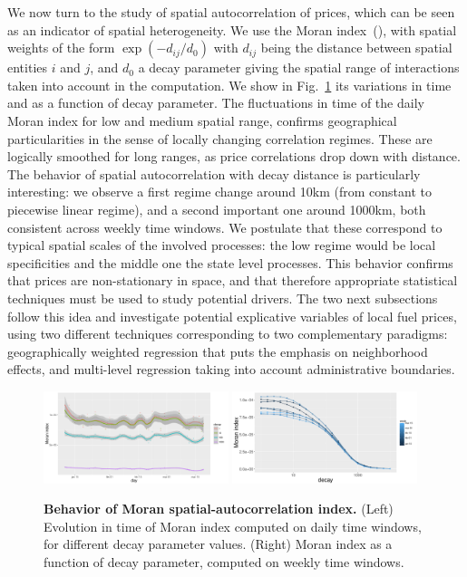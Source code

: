 \documentclass[3p,times,procedia]{elsarticle}
\begin{document}
We now turn to the study of spatial autocorrelation of prices, which can be seen as an indicator of spatial heterogeneity. We use the Moran index~(\cite{tsai2005quantifying}), with spatial weights of the form $\exp{\left(-d_{ij} / d_0 \right)}$ with $d_{ij}$ being the distance between spatial entities $i$ and $j$, and $d_0$ a decay parameter giving the spatial range of interactions taken into account in the computation. We show in Fig.~\ref{fig:moran} its variations in time and as a function of decay parameter. 
The fluctuations in time of the daily Moran index for low and medium spatial range, confirms geographical particularities in the sense of locally changing correlation regimes. These are logically smoothed for long ranges, as price correlations drop down with distance. The behavior of spatial autocorrelation with decay distance is particularly interesting: we observe a first regime change around 10km (from constant to piecewise linear regime), and a second important one around 1000km, both consistent across weekly time windows. We postulate that these correspond to typical spatial scales of the involved processes: the low regime would be local specificities and the middle one the state level processes. This behavior confirms that prices are non-stationary in space, and that therefore appropriate statistical techniques must be used to study potential drivers. The two next subsections follow this idea and investigate potential explicative variables of local fuel prices, using two different techniques corresponding to two complementary paradigms: geographically weighted regression that puts the emphasis on neighborhood effects, and multi-level regression taking into account administrative boundaries.



\begin{figure}
\centering
\includegraphics[width=0.48\textwidth]{figures/moran_days}
\includegraphics[width=0.48\textwidth]{figures/moran_decay_weeks}
\caption{\textbf{Behavior of Moran spatial-autocorrelation index.} (Left) Evolution in time of Moran index computed on daily time windows, for different decay parameter values. (Right) Moran index as a function of decay parameter, computed on weekly time windows.}
\label{fig:moran}
\end{figure}
\end{document}

